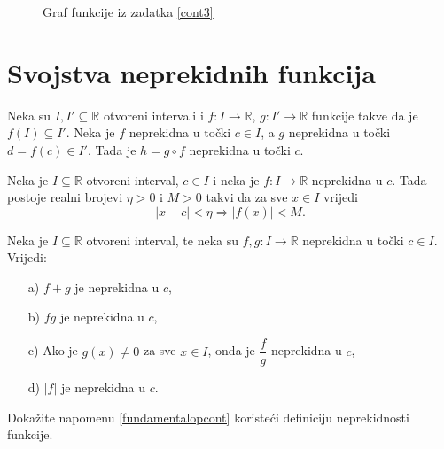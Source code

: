 \begin{proof*}
\begin{figure}[ht]
\begin{center}
\end{center}
\caption{Graf funkcije iz zadatka \ref{cont3}}
\end{figure}
\end{proof*}
\section{Svojstva neprekidnih funkcija}
\begin{remark}
\label{compcont}
Neka su $I, I'\subseteq \mathbb{R}$ otvoreni intervali i $f : I\to \mathbb{R}$, $g : I'\to \mathbb{R}$ funkcije takve da je $f(I)\subseteq I'$. Neka je $f$ neprekidna u točki $c\in I$, a $g$ neprekidna u točki $d=f(c)\in I'$. Tada je $h=g\circ f$ neprekidna u točki $c$.
\end{remark}
\begin{remark}
\label{localbound}
Neka je $I\subseteq \mathbb{R}$ otvoreni interval, $c\in I$ i neka je $f : I\to \mathbb{R}$ neprekidna u $c$. Tada postoje realni brojevi $\eta>0$ i $M>0$ takvi da za sve $x\in I$ vrijedi
$$|x-c|<\eta\Longrightarrow |f(x)|<M.$$
\end{remark}
\begin{remark}
\label{fundamentalopcont}
Neka je $I\subseteq \mathbb{R}$ otvoreni interval, te neka su $f, g : I\to \mathbb{R}$ neprekidna u točki $c\in I$. Vrijedi:
\begin{itemize}
\item[a)] $f+g$ je neprekidna u $c$,
\item[b)] $fg$ je neprekidna u $c$,
\item[c)] Ako je $g(x)\neq 0$ za sve $x\in I$, onda je $\dfrac{f}{g}$ neprekidna u $c$,
\item[d)] $|f|$ je neprekidna u $c$.
\end{itemize}
\end{remark}
\begin{exercise}
Dokažite napomenu \ref{fundamentalopcont} koristeći definiciju neprekidnosti funkcije.
\end{exercise}
